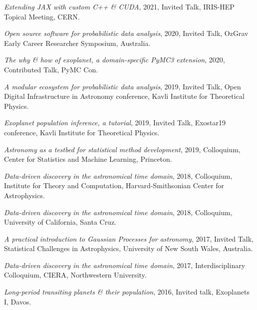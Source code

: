 \documentclass[12pt,letterpaper]{article}
\begin{document}
\begin{list}{}{\cvlist}

  \item \emph{Extending JAX with custom C++ \& CUDA},
        2021, Invited Talk, IRIS-HEP Topical Meeting, CERN.

  \item \emph{Open source software for probabilistic data analysis},
        2020, Invited Talk, OzGrav Early Career Researcher Symposium, Australia.

  \item \emph{The why \& how of exoplanet, a domain-specific PyMC3 extension},
        2020, Contributed Talk, PyMC Con.

  \item \emph{A modular ecosystem for probabilistic data analysis},
        2019, Invited Talk, Open Digital Infrastructure in Astronomy conference,
        Kavli Institute for Theoretical Physics.

  \item \emph{Exoplanet population inference, a tutorial},
        2019, Invited Talk, Exostar19 conference,
        Kavli Institute for Theoretical Physics.

  \item \emph{Astronomy as a testbed for statistical method development},
        2019, Colloquium, Center for Statistics and Machine Learning,
        Princeton.

  \item \emph{Data-driven discovery in the astronomical time domain},
        2018, Colloquium, Institute for Theory and Computation,
        Harvard-Smithsonian Center for Astrophysics.

  \item \emph{Data-driven discovery in the astronomical time domain},
        2018, Colloquium, University of California, Santa Cruz.

  \item \emph{A practical introduction to Gaussian Processes for astronomy},
        2017, Invited Talk, Statistical Challenges in Astrophysics,
        University of New South Wales, Australia.

  \item \emph{Data-driven discovery in the astronomical time domain},
        2017, Interdisciplinary Colloquium, CIERA, Northwestern University.

  \item \emph{Long-period transiting planets \& their population},
        2016, Invited talk, Exoplanets I, Davos.


\end{list}
\end{document}

